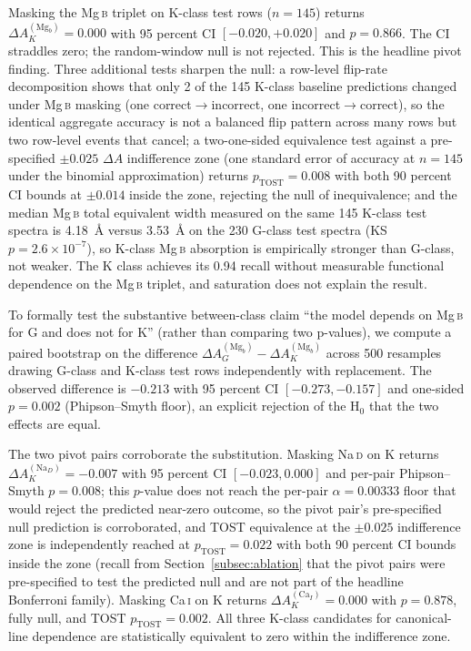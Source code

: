 \documentclass[11pt,a4paper]{article}
\newcommand{\Mgb}{Mg\,\textsc{b}\xspace}
\newcommand{\NaD}{Na\,\textsc{d}\xspace}
\newcommand{\CaI}{Ca\,\textsc{i}\xspace}
\newcommand{\dA}{\Delta A}
\begin{document}
Masking the \Mgb triplet on K-class test rows ($n = 145$) returns $\dA_K^{(\mathrm{Mg}_b)} = 0.000$ with 95 percent CI $[-0.020, +0.020]$ and $p = 0.866$. The CI straddles zero; the random-window null is not rejected. This is the headline pivot finding. Three additional tests sharpen the null: a row-level flip-rate decomposition shows that only 2 of the 145 K-class baseline predictions changed under \Mgb masking (one correct$\to$incorrect, one incorrect$\to$correct), so the identical aggregate accuracy is not a balanced flip pattern across many rows but two row-level events that cancel; a two-one-sided equivalence test against a pre-specified $\pm 0.025$ $\dA$ indifference zone (one standard error of accuracy at $n=145$ under the binomial approximation) returns $p_{\mathrm{TOST}} = 0.008$ with both 90 percent CI bounds at $\pm 0.014$ inside the zone, rejecting the null of inequivalence; and the median \Mgb total equivalent width measured on the same 145 K-class test spectra is 4.18~\AA{} versus 3.53~\AA{} on the 230 G-class test spectra (KS $p = 2.6 \times 10^{-7}$), so K-class \Mgb absorption is empirically stronger than G-class, not weaker. The K class achieves its 0.94 recall without measurable functional dependence on the \Mgb triplet, and saturation does not explain the result.

To formally test the substantive between-class claim ``the model depends on \Mgb for G and does not for K'' (rather than comparing two p-values), we compute a paired bootstrap on the difference $\dA_G^{(\mathrm{Mg}_b)} - \dA_K^{(\mathrm{Mg}_b)}$ across 500 resamples drawing G-class and K-class test rows independently with replacement. The observed difference is $-0.213$ with 95 percent CI $[-0.273, -0.157]$ and one-sided $p = 0.002$ (Phipson--Smyth floor), an explicit rejection of the H$_0$ that the two effects are equal.

The two pivot pairs corroborate the substitution. Masking \NaD on K returns $\dA_K^{(\mathrm{Na}_D)} = -0.007$ with 95 percent CI $[-0.023, 0.000]$ and per-pair Phipson--Smyth $p = 0.008$; this $p$-value does not reach the per-pair $\alpha = 0.00333$ floor that would reject the predicted near-zero outcome, so the pivot pair's pre-specified null prediction is corroborated, and TOST equivalence at the $\pm 0.025$ indifference zone is independently reached at $p_{\mathrm{TOST}} = 0.022$ with both 90 percent CI bounds inside the zone (recall from Section~\ref{subsec:ablation} that the pivot pairs were pre-specified to test the predicted null and are not part of the headline Bonferroni family). Masking \CaI on K returns $\dA_K^{(\mathrm{Ca}_I)} = 0.000$ with $p = 0.878$, fully null, and TOST $p_{\mathrm{TOST}} = 0.002$. All three K-class candidates for canonical-line dependence are statistically equivalent to zero within the indifference zone.
\end{document}
